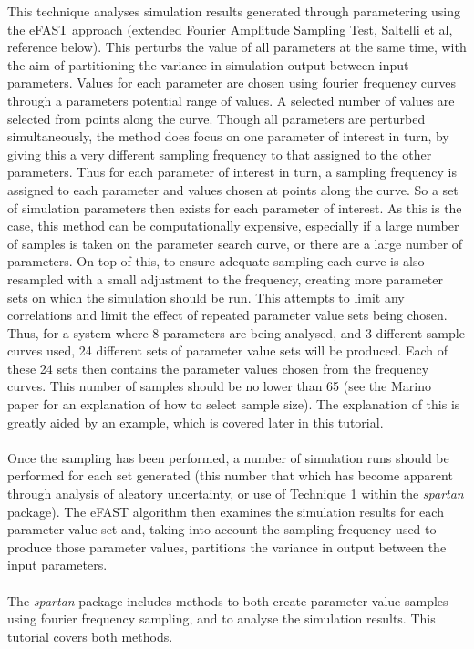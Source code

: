 \documentclass[a4paper,11pt]{article}
\begin{document}
\noindent This technique analyses simulation results generated through parametering using the eFAST approach (extended Fourier Amplitude Sampling Test, Saltelli et al, reference below). This perturbs the value of all parameters at the same time, with the aim of partitioning the variance in simulation output between input parameters. Values for each parameter are chosen using fourier frequency curves through a parameters potential range of values. A selected number of values are selected from points along the curve. Though all parameters are perturbed simultaneously, the method does focus on one parameter of interest in turn, by giving this a very different sampling frequency to that assigned to the other parameters. Thus for each parameter of interest in turn, a sampling frequency is assigned to each parameter and values chosen at points along the curve. So a set of simulation parameters then exists for each parameter of interest.  As this is the case, this method can be computationally expensive, especially if a large number of samples is taken on the parameter search curve, or there are a large number of parameters. On top of this, to ensure adequate sampling each curve is also resampled with a small adjustment to the frequency, creating more parameter sets on which the simulation should be run. This attempts to limit any correlations and limit the effect of repeated parameter value sets being chosen. Thus, for a system where 8 parameters are being analysed, and 3 different sample curves used, 24 different sets of parameter value sets will be produced. Each of these 24 sets then contains the parameter values chosen from the frequency curves. This number of samples should be no lower than 65 (see the Marino paper for an explanation of how to select sample size). The explanation of this is greatly aided by an example, which is covered later in this tutorial.\\
\\
Once the sampling has been performed, a number of simulation runs should be performed for each set generated (this number that which has become apparent through analysis of aleatory uncertainty, or use of Technique 1 within the \textit{spartan} package). The eFAST algorithm then examines the simulation results for each parameter value set and, taking into account the sampling frequency used to produce those parameter values, partitions the variance in output between the input parameters.\\
\\
The \textit{spartan} package includes methods to both create parameter value samples using fourier frequency sampling, and to analyse the simulation results. This tutorial covers both methods.\\
\end{document}
